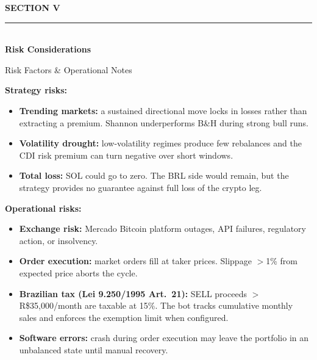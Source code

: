 \documentclass[aspectratio=169,10pt]{beamer}
\begin{document}
\begin{frame}[plain]
\vspace{2.5cm}
\begin{center}
  {\color{Gold}\small\bfseries SECTION V}\\[0.3cm]
  {\color{Gold}\rule{6cm}{0.6pt}}\\[0.4cm]
  {\color{white}\fontsize{22}{28}\selectfont\bfseries Risk Considerations}
\end{center}
\end{frame}

\begin{frame}{Risk Factors \& Operational Notes}
\vspace{0.3em}
{\small\color{BodyText}
\textbf{Strategy risks:}
\begin{itemize}
  \setlength\itemsep{0.15em}
  \item \textbf{Trending markets:} a sustained directional move locks in losses
        rather than extracting a premium. Shannon underperforms B\&H during strong bull runs.
  \item \textbf{Volatility drought:} low-volatility regimes produce few rebalances
        and the CDI risk premium can turn negative over short windows.
  \item \textbf{Total loss:} SOL could go to zero. The BRL side would remain,
        but the strategy provides no guarantee against full loss of the crypto leg.
\end{itemize}

\vspace{0.3em}
\textbf{Operational risks:}
\begin{itemize}
  \setlength\itemsep{0.15em}
  \item \textbf{Exchange risk:} Mercado Bitcoin platform outages, API failures,
        regulatory action, or insolvency.
  \item \textbf{Order execution:} market orders fill at taker prices.
        Slippage $>$1\% from expected price aborts the cycle.
  \item \textbf{Brazilian tax (Lei 9.250/1995 Art.~21):} SELL proceeds
        $>$R\$35{,}000/month are taxable at 15\%. The bot tracks cumulative
        monthly sales and enforces the exemption limit when configured.
  \item \textbf{Software errors:} crash during order execution may leave
        the portfolio in an unbalanced state until manual recovery.
\end{itemize}
}
\end{frame}
\end{document}
